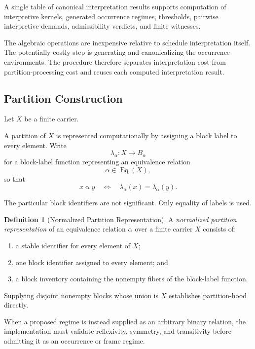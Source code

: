 \documentclass[11pt]{article}
\theoremstyle{plain}
\theoremstyle{definition}
\newtheorem{definition}[theorem]{Definition}
\theoremstyle{remark}
\begin{document}
A single table of canonical interpretation results
supports computation of interpretive kernels,
generated occurrence regimes,
thresholds,
pairwise interpretive demands,
admissibility verdicts,
and finite witnesses.

The algebraic operations are inexpensive
relative to schedule interpretation itself.
The potentially costly step is generating
and canonicalizing the occurrence environments.
The procedure therefore separates
interpretation cost from partition-processing cost
and reuses each computed interpretation result.

\subsection{Partition Construction}

Let \(X\) be a finite carrier.

A partition of \(X\) is represented computationally
by assigning a block label to every element.
Write
\[
  \lambda_{\alpha}:
  X
  \longrightarrow
  B_{\alpha}
\]
for a block-label function representing
an equivalence relation
\[
  \alpha
  \in
  \operatorname{Eq}(X),
\]
so that
\[
  x\mathrel{\alpha}y
  \quad\Longleftrightarrow\quad
  \lambda_{\alpha}(x)
  =
  \lambda_{\alpha}(y).
\]

The particular block identifiers are not significant.
Only equality of labels is used.

\begin{definition}[Normalized Partition Representation]
  \label{ik.def.normalized-partition}
  A \emph{normalized partition representation}
  of an equivalence relation \(\alpha\)
  over a finite carrier \(X\) consists of:
  \begin{enumerate}[label=(\alph*)]
    \item a stable identifier for every element of \(X\);
    \item one block identifier assigned to every element; and
    \item a block inventory containing the nonempty fibers of the block-label function.
  \end{enumerate}
\end{definition}

Supplying disjoint nonempty blocks
whose union is \(X\)
establishes partition-hood directly.

When a proposed regime is instead supplied
as an arbitrary binary relation,
the implementation must validate reflexivity,
symmetry,
and transitivity
before admitting it as an occurrence or frame regime.
\end{document}
